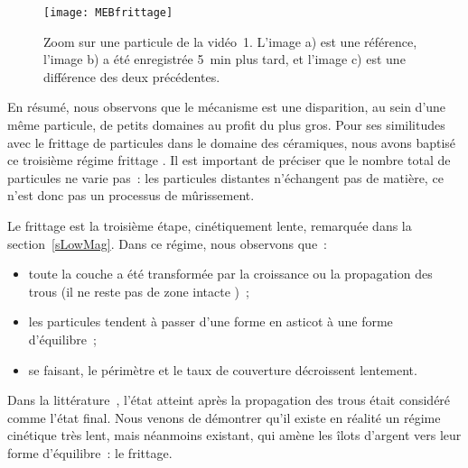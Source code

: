 \begin{figure}[h]
	\centering
	\texttt{[image: MEBfrittage]}
	\caption{Zoom sur une particule de la vidéo~1. L'image a) est une référence, l'image b) a été enregistrée 5~min plus tard, et l'image c) est une différence des deux précédentes.}
	\label{MEBfrittage}
\end{figure}

En résumé, nous observons que le mécanisme est une disparition, au sein d'une même particule, de petits domaines au profit du plus gros. Pour ses similitudes avec le frittage de particules dans le domaine des céramiques, nous avons baptisé ce troisième régime \og frittage \fg. Il est important de préciser que le nombre total de particules ne varie pas~: les particules distantes n'échangent pas de matière, ce n'est donc pas un processus de mûrissement.\par
Le frittage est la troisième étape, cinétiquement lente, remarquée dans la section~\ref{sLowMag}. Dans ce régime, nous observons que~:
\begin{itemize}
\item toute la couche a été transformée par la croissance ou la propagation des trous (il ne reste pas de zone \og intacte \fg{})~;
\item les particules tendent à passer d'une forme en asticot à une forme d'équilibre~;
\item se faisant, le périmètre et le taux de couverture décroissent lentement. 
\end{itemize}
Dans la littérature~\cite{presland1972hillock,morawiec2013self}, l'état atteint après la propagation des trous était considéré comme l'état final. Nous venons de démontrer qu'il existe en réalité un régime cinétique très lent, mais néanmoins existant, qui amène les îlots d'argent vers leur forme d'équilibre~: le frittage.\par



